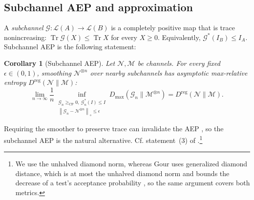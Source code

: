 \documentclass[11pt,letterpaper]{article}
\numberwithin{equation}{section}
\newtheorem{corollary}[theorem]{Corollary}
\newcommand{\N}{\mathcal N}
\newcommand{\M}{\mathcal M}
\newcommand{\Tr}{\operatorname{Tr}}
\newcommand{\reg}{\mathrm{reg}}
\newcommand{\cp}{\mathrm{CP}}
\newcommand{\cL}{\mathcal L}
\newcommand{\norm}[1]{\left\lVert#1\right\rVert}
\begin{document}
\subsection{Subchannel AEP and approximation}
A \emph{subchannel} $\mathcal G:\cL(A)\to\cL(B)$ is a completely positive map that is trace nonincreasing: $\Tr\mathcal G(X)\le\Tr X$ for every $X\ge0$. Equivalently, $\mathcal G^*(I_B)\le I_A$. %
Subchannel AEP is the following statement:
\begin{corollary}[Subchannel AEP]\label{cor:subchannel-aep}
Let $\N,\M$ be channels. For every fixed $\epsilon\in(0,1)$, smoothing $\N^{\otimes n}$ over nearby subchannels has asymptotic max-relative entropy $D^{\reg}(\N\|\M)$:
\begin{equation}\label{eq:subchannel-aep}
 \lim_{n\to\infty}\frac1n
 \inf_{\substack{\mathcal G_n\ge_{\cp}0,\ \mathcal G_n^*(I)\le I\\
                 \norm{\mathcal G_n-\N^{\otimes n}}_\diamond\le\epsilon}}
 D_{\max}(\mathcal G_n\|\M^{\otimes n})
 =D^{\reg}(\N\|\M).
\end{equation}
\end{corollary}

Requiring the smoother to preserve trace can invalidate the AEP \cite[Section VI]{Gour}, so the subchannel AEP is the natural alternative. Cf. statement~(3) of \cite[Theorem 14]{Gour}.\footnote{We use the unhalved diamond norm, whereas Gour uses generalized diamond distance, which is at most the unhalved diamond norm and bounds the decrease of a test's acceptance probability \cite[Eqs.~(31)--(32), (211)]{Gour}, so the same argument covers both metrics.}
\end{document}
